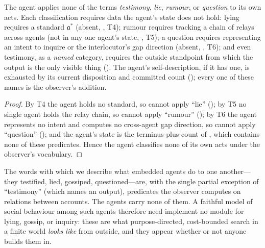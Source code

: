 \documentclass[11pt,twocolumn,a4paper]{article}
\newcommand{\acct}{\mathfrak{a}}   %
\begin{document}
\begin{corollary}
\label{cor:agentnovocab}
The agent applies none of the terms \emph{testimony}, \emph{lie},
\emph{rumour}, or \emph{question} to its own acts. Each classification
requires data the agent's state does not hold: lying requires a standard
$\acct^\ast$ (absent, , T4); rumour requires
tracking a chain of relays across agents (not in any one agent's state,
, T5); a question requires representing an intent to inquire
or the interlocutor's gap direction (absent, ,
T6); and even testimony, as a \emph{named} category, requires the
outside standpoint from which the output is the only visible thing
(). The agent's self-description, if it has one, is
exhausted by its current disposition and committed count
(); every one of these names is the observer's addition.
\end{corollary}

\begin{proof}
By T4 the agent holds no standard, so cannot apply ``lie''
(); by T5 no single agent holds the relay chain,
so cannot apply ``rumour'' (); by T6 the agent represents no
intent and computes no cross-agent gap direction, so cannot apply
``question'' (); and the agent's state is
the terminus-plus-count of , which contains none of
these predicates. Hence the agent classifies none of its own acts under the
observer's vocabulary.
\end{proof}

\begin{principle}
\label{prin:observer}
The words with which we describe what embedded agents do to one another---
they testified, lied, gossiped, questioned---are, with the single partial
exception of ``testimony'' (which names an output), predicates the observer
computes on relations between accounts. The agents carry none of them. A
faithful model of social behaviour among such agents therefore need
implement no module for lying, gossip, or inquiry: these are what
purpose-directed, cost-bounded search in a finite world \emph{looks like}
from outside, and they appear whether or not anyone builds them in.
\end{principle}

\end{document}
